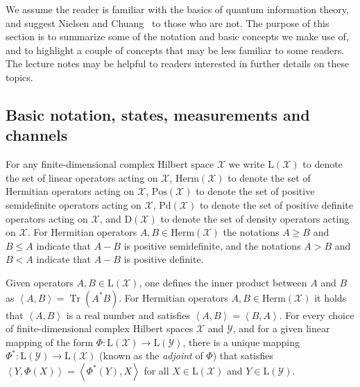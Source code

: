 \documentclass[11pt,letterpaper]{article}
\theoremstyle{definition}
\newcommand{\tr}{\operatorname{Tr}}
\newcommand{\ip}[2]{\left\langle #1 , #2\right\rangle}
\newcommand{\setft}[1]{\mathrm{#1}}
\newcommand{\lin}[1]{\setft{L}\left(#1\right)}
\newcommand{\density}[1]{\setft{D}\left(#1\right)}
\newcommand{\herm}[1]{\setft{Herm}\left(#1\right)}
\newcommand{\pos}[1]{\setft{Pos}\left(#1\right)}
\newcommand{\pd}[1]{\setft{Pd}\left(#1\right)}
\def\X{\mathcal{X}}
\def\Y{\mathcal{Y}}
\begin{document}
We assume the reader is familiar with the basics of quantum
information theory, and suggest Nielsen and Chuang~\cite{NielsenC00}
to those who are not.
The purpose of this section is to summarize some of the notation and
basic concepts we make use of, and to highlight a couple of concepts
that may be less familiar to some readers.
The lecture notes \cite{WatrousNotes} may be helpful to readers
interested in further details on these topics.

\subsection{Basic notation, states, measurements and channels}

For any finite-dimensional complex Hilbert space $\X$ we write
$\lin{\X}$ to denote the set of linear operators acting on $\X$, 
 $\herm{\X}$ to denote the set of Hermitian operators acting
on $\X$, $\pos{\X}$ to denote the set of positive
semidefinite operators acting on $\X$, $\pd{\X}$ to denote
the set of positive definite operators acting on $\X$, and 
$\density{\X}$ to denote the set of density operators acting on $\X$.
For Hermitian operators $A,B\in\herm{\X}$ the notations $A\geq B$ and
$B\leq A$ indicate that $A - B$ is positive semidefinite, and the
notations $A > B$ and $B < A$ indicate that $A - B$ is positive definite.

Given operators $A,B\in\lin{\X}$, one defines the inner product
between $A$ and $B$ as $\ip{A}{B} = \tr(A^{\ast}B)$.
For Hermitian operators $A,B\in\herm{\X}$ it holds that
$\ip{A}{B}$ is a real number and satisfies $\ip{A}{B} = \ip{B}{A}$.
For every choice of finite-dimensional complex Hilbert spaces $\X$ and
$\Y$, and for a given linear mapping of the form
$\Phi:\lin{\X}\rightarrow\lin{\Y}$, there is a unique mapping
$\Phi^{\ast}:\lin{\Y}\rightarrow\lin{\X}$ (known as the \emph{adjoint}
of $\Phi$) that satisfies
$\ip{Y}{\Phi(X)} = \ip{\Phi^{\ast}(Y)}{X}$ for all $X\in\lin{\X}$ and
$Y\in\lin{\Y}$.
\end{document}
